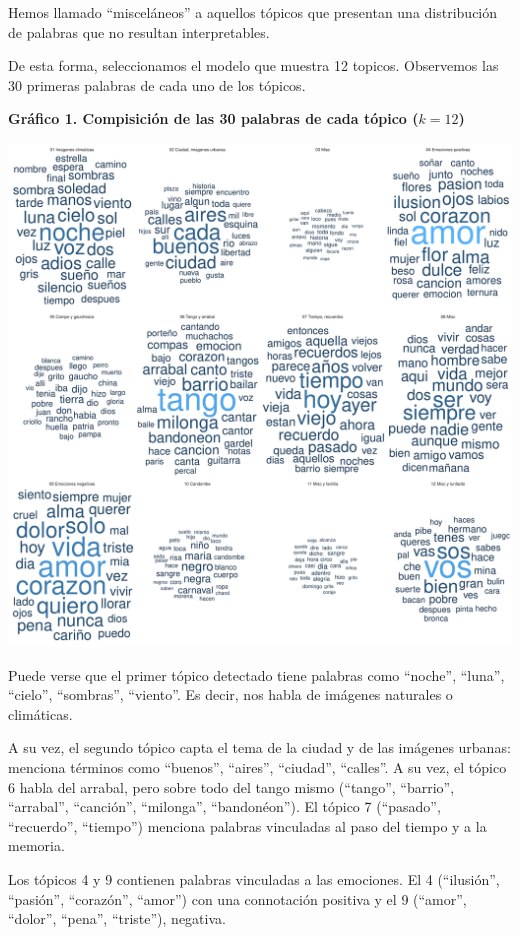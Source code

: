 \documentclass[]{article}
\begin{document}
Hemos llamado ``misceláneos'' a aquellos tópicos que presentan una
distribución de palabras que no resultan interpretables.

De esta forma, seleccionamos el modelo que muestra 12 topicos.
Observemos las 30 primeras palabras de cada uno de los tópicos.

\textbf{Gráfico 1. Compisición de las 30 palabras de cada tópico
(\(k=12\))}

\includegraphics{Notebook_files/figure-latex/unnamed-chunk-2-1.pdf}

Puede verse que el primer tópico detectado tiene palabras como
``noche'', ``luna'', ``cielo'', ``sombras'', ``viento''. Es decir, nos
habla de imágenes naturales o climáticas.

A su vez, el segundo tópico capta el tema de la ciudad y de las imágenes
urbanas: menciona términos como ``buenos'', ``aires'', ``ciudad'',
``calles''. A su vez, el tópico 6 habla del arrabal, pero sobre todo del
tango mismo (``tango'', ``barrio'', ``arrabal'', ``canción'',
``milonga'', ``bandonéon''). El tópico 7 (``pasado'', ``recuerdo'',
``tiempo'') menciona palabras vinculadas al paso del tiempo y a la
memoria.

Los tópicos 4 y 9 contienen palabras vinculadas a las emociones. El 4
(``ilusión'', ``pasión'', ``corazón'', ``amor'') con una connotación
positiva y el 9 (``amor'', ``dolor'', ``pena'', ``triste''), negativa.
\end{document}
